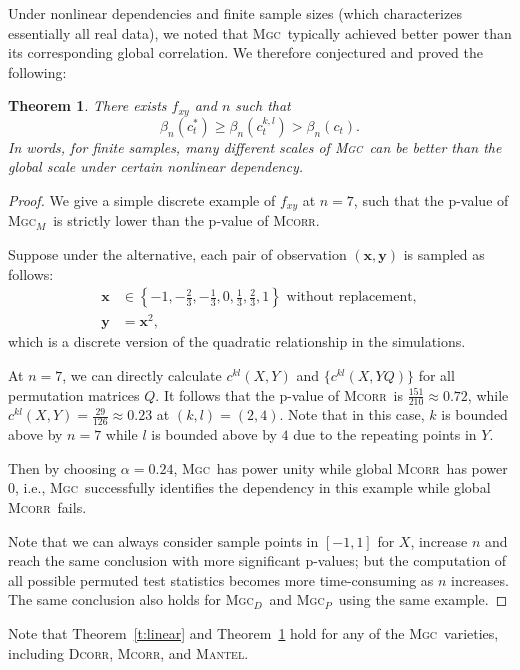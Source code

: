 \documentclass[11pt]{article}
\providecommand{\sct}[1]{{\normalfont\textsc{#1}}}
\providecommand{\mb}[1]{\boldsymbol{#1}}
\newcommand{\G}{c}
\newcommand{\Mgc}{\sct{Mgc}}
\newcommand{\Mgcp}{\sct{Mgc$_P$}}
\newcommand{\Mgcd}{\sct{Mgc$_D$}}
\newcommand{\Mgcm}{\sct{Mgc$_M$}}
\newcommand{\Dcorr}{\sct{Dcorr}}
\newcommand{\Mcorr}{\sct{Mcorr}}
\newcommand{\Mantel}{\sct{Mantel}}
\newtheorem{thm}{Theorem}
\begin{document}
Under nonlinear dependencies and finite sample sizes (which characterizes essentially all real data), we noted that \Mgc~typically achieved better power than its corresponding global correlation. 
We therefore conjectured and proved the following:
\begin{thm}
\label{t:non}
There exists $f_{xy}$ and $n$ such that
\begin{equation}
\beta_n(\G_t^*) \geq \beta_n(\G^{k,l}_{t}) > \beta_n(\G_{t}).
\end{equation}
In words, for finite samples, many different scales of \Mgc~can be better than the global scale under certain nonlinear dependency.
\end{thm}
\begin{proof}
We give a simple discrete example of $f_{xy}$ at $n=7$, such that the p-value of \Mgcm~is strictly lower than the p-value of \Mcorr.

Suppose under the alternative, each pair of observation $(\mb{x},\mb{y})$ is sampled as follows:
\begin{align*}
\mb{x} &\in \left\{-1,-\frac{2}{3},-\frac{1}{3},0,\frac{1}{3},\frac{2}{3},1\right\} \mbox{ without replacement}, \\
\mb{y} &= \mb{x}^2,
\end{align*}
which is a discrete version of the quadratic relationship in the simulations.

At $n=7$, we can directly calculate $\G^{kl}(X, Y)$ and $\{\G^{kl}(X, YQ)\}$ for all permutation matrices $Q$. It follows that the p-value of \Mcorr~is $\frac{151}{210} \approx 0.72$, while $\G^{kl}(X, Y)=\frac{29}{126} \approx 0.23$ at $(k,l)=(2,4)$. Note that in this case, $k$ is bounded above by $n=7$ while $l$ is bounded above by $4$ due to the repeating points in $Y$. 

Then by choosing $\alpha=0.24$, \Mgc~has power unity while global \Mcorr~has power $0$, i.e., \Mgc~successfully identifies the dependency in this example while global \Mcorr~fails.

Note that we can always consider sample points in $[-1,1]$ for $X$, increase $n$ and reach the same conclusion with more significant p-values; but the computation of all possible permuted test statistics becomes more time-consuming as $n$ increases. The same conclusion also holds for \Mgcd~and \Mgcp~using the same example.
\end{proof}
Note that Theorem~\ref{t:linear} and Theorem~\ref{t:non} hold for any of the \Mgc~varieties, including  \Dcorr, \Mcorr, and \Mantel.
\end{document}
